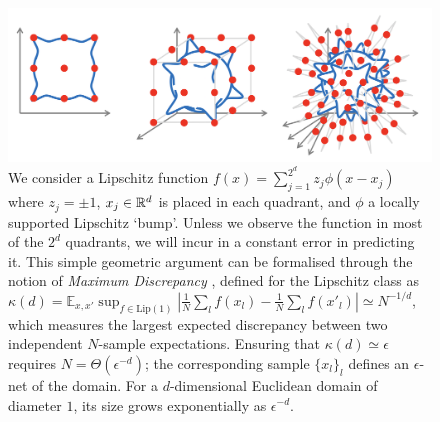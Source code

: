 

\begin{figure}[h!]
    \centering
       \includegraphics[width=\linewidth]{figures/blobs.png} 
    \caption{We consider a Lipschitz function $f(x) = \sum_{j=1}^{2^d} z_j \phi(x-x_j)$ where $z_j=\pm 1$, $x_j \in \mathbb{R}^d$ is placed in each quadrant, and $\phi$ a locally supported Lipschitz `bump'. Unless we observe the function in most of the $2^d$ quadrants, we will incur in a constant error in predicting it. This simple geometric argument can be formalised through the notion of \emph{Maximum Discrepancy} \citep{von2004distance}, defined for the Lipschitz class as $\kappa(d)=\mathbb{E}_{x,x'} \sup_{f \in \mathrm{Lip}(1)} \left| \frac{1}{N}\sum_{l} f(x_l) - \frac{1}{N}\sum_{l} f(x'_l) \right| \simeq N^{-1/d}$, which measures the largest expected discrepancy between two independent $N$-sample expectations. Ensuring that $\kappa(d) \simeq \epsilon$ requires $N = \Theta(\epsilon^{-d})$; the corresponding sample $\{x_l\}_l$ defines an $\epsilon$-net of the domain. For a $d$-dimensional Euclidean domain of diameter $1$, its size grows exponentially as $\epsilon^{-d}$.}
    \label{fig:curseofdim}
\end{figure}



